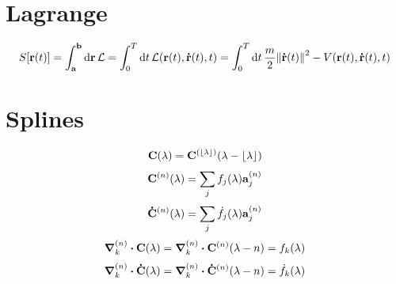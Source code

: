 \documentclass{article}
\begin{document}
\makeatletter
\def\vec#1{\vb{#1}}
\def\floor#1{\lfloor #1 \rfloor}


\section{Lagrange}

\def\r{\vec{r}}
\def\dr{\vec{\dot{r}}}
\def\r@t{\r\qty(t)}
\def\dr@t{\dr\qty(t)}

\def\action{S}
\def\action@r{\action\qty[\r@t]}

\def\lagrange{\mathcal{L}}
\def\lagrange@t{\lagrange\qty(\r@t, \dr@t, t)}

\def\potential{V}
\def\potential@t{\potential\qty(\r@t, \dr@t, t)}

\def\int@ab{\int^{\vec{b}}_{\vec{a}} \dd{\r}}
\def\int@t{\int^T_0 \dd{t}}

\begin{align*}
    \action@r = 
    \int@ab \lagrange = 
    \int@t \lagrange@t =
    \int@t \frac m2 \norm{\dr@t}^2 - \potential@t
\end{align*}


\section{Splines}

\def\curve{\vec{C}}
\def\curve@lambda{\curve\qty(\lambda)}
\def\dcurve{\vec{\dot{C}}}
\def\dcurve@lambda{\dcurve\qty(\lambda)}

\def\segment{\curve^{(n)}}
\def\segment@lambda{\segment\qty(\lambda)}
\def\segment@nlambda{\segment\qty(\lambda - n)}
\def\segment@floor{\curve^{(\floor\lambda)}}
\def\segment@floor@lambda{\segment@floor\qty(\lambda - \floor\lambda)}
\def\dsegment{\dcurve^{(n)}}
\def\dsegment@lambda{\dsegment\qty(\lambda)}
\def\dsegment@nlambda{\dsegment\qty(\lambda - n)}

\def\basis_#1{f_#1}
\def\basis@lambda_#1{\basis_#1\qty(\lambda)}
\def\dbasis_#1{\dot{f}_#1}
\def\dbasis@lambda_#1{\dbasis_#1\qty(\lambda)}
\def\control{\vec{a}^{(n)}_j}

\def\cgrad{\grad^{(n)}_k}
\def\cdiv{\cgrad\vdot}

\begin{align*}
    \curve@lambda = 
    \segment@floor@lambda
\end{align*}
\begin{align*}
    \segment@lambda = 
    \sum_j \basis@lambda_j \control
\end{align*}
\begin{align*}
    \dsegment@lambda = 
    \sum_j \dbasis@lambda_j \control
\end{align*}
\begin{align*}
    \cdiv\curve@lambda = 
    \cdiv\segment@nlambda = 
    \basis@lambda_k
\end{align*}
\begin{align*}
    \cdiv\dcurve@lambda = 
    \cdiv\dsegment@nlambda = 
    \dbasis@lambda_k
\end{align*}
\end{document}
